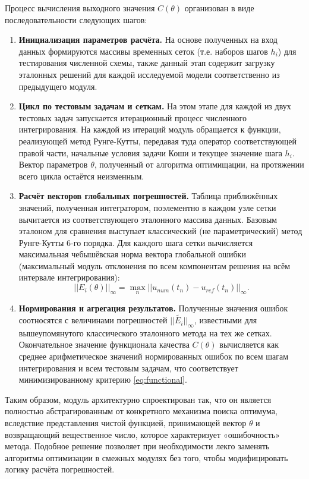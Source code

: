 Процесс вычисления выходного значения $C(\theta)$ организован в виде последовательности следующих шагов:
\begin{enumerate}
	\item \textbf{Инициализация параметров расчёта.} На основе полученных на вход данных формируются массивы временных сеток (т.е. наборов шагов $h_i$) для тестирования численной схемы, также данный этап содержит загрузку эталонных решений для каждой исследуемой модели соответственно из предыдущего модуля.
	\item \textbf{Цикл по тестовым задачам и сеткам.} На этом этапе для каждой из двух тестовых задач запускается итерационный процесс численного интегрирования. На каждой из итераций модуль обращается к функции, реализующей метод Рунге-Кутты, передавая туда оператор соответствующей правой части, начальные условия задачи Коши и текущее значение шага $h_i$. Вектор параметров $\theta$, полученный от алгоритма оптимищации, на протяжении всего цикла остаётся неизменным.
	\item \textbf{Расчёт векторов глобальных погрешностей.} Таблица приближённых значений, полученная интегратором, поэлементно в каждом узле сетки вычитается из соответствующего эталонного массива данных. Базовым эталоном для сравнения выступает классический (не параметрический) метод Рунге-Кутты 6-го порядка. Для каждого шага сетки вычисляется максимальная чебышёвская норма вектора глобальной ошибки (максимальный модуль отклонения по всем компонентам решения на всём интервале интегрирования):
	\begin{equation*}
		|| E_i(\theta)||_{\infty} = \max_n ||u_{num}(t_n) - u_{ref}(t_n) ||_{\infty}.
	\end{equation*}
	\item \textbf{Нормирования и агрегация результатов.} Полученные значения ошибок соотносятся с величинами погрешностей $|| \tilde{E_i} ||_{\infty}$, известными для вышеупомянутого классического эталонного метода на тех же сетках. Окончательное значение функционала качества $C(\theta)$ вычисляется как среднее арифметическое значений нормированных ошибок по всем шагам интегрирования и всем тестовым задачам, что соответствует минимизированному критерию \eqref{eq:functional}.
\end{enumerate}
Таким образом, модуль архитектурно спроектирован так, что он является полностью абстрагированным от конкретного механизма поиска оптимума, вследствие представления чистой функцией, принимающей вектор $\theta$ и возвращающий вещественное число, которое характеризует «ошибочность» метода. Подобное решение позволяет при необходимости лекго заменять алгоритмы оптимизации в смежных модулях без того, чтобы модифицировать логику расчёта погрешностей.

